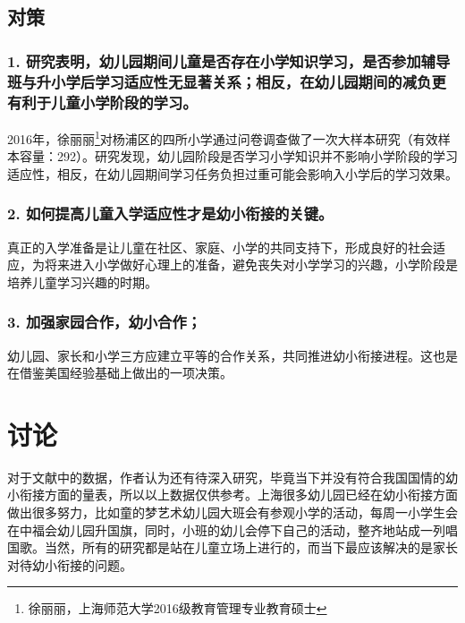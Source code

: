 \documentclass[a4paper,oneside]{article}
\begin{document}
    \subsection{对策}
        \subsubsection*{1. 研究表明，幼儿园期间儿童是否存在小学知识学习，是否参加辅导班与升小学后学习适应性无显著关系；相反，在幼儿园期间的减负更有利于儿童小学阶段的学习。}
            2016年，徐丽丽\footnote{徐丽丽，上海师范大学2016级教育管理专业教育硕士}对杨浦区的四所小学通过问卷调查做了一次大样本研究（有效样本容量：292）。研究发现，幼儿园阶段是否学习小学知识并不影响小学阶段的学习适应性，相反，在幼儿园期间学习任务负担过重可能会影响入小学后的学习效果。
        \subsubsection*{2. 如何提高儿童入学适应性才是幼小衔接的关键。}
            真正的入学准备是让儿童在社区、家庭、小学的共同支持下，形成良好的社会适应，为将来进入小学做好心理上的准备，避免丧失对小学学习的兴趣，小学阶段是培养儿童学习兴趣的时期。
        \subsubsection*{3. 加强家园合作，幼小合作；}
            幼儿园、家长和小学三方应建立平等的合作关系，共同推进幼小衔接进程。这也是在借鉴美国经验基础上做出的一项决策。
\section{讨论}
    对于文献中的数据，作者认为还有待深入研究，毕竟当下并没有符合我国国情的幼小衔接方面的量表，所以以上数据仅供参考。上海很多幼儿园已经在幼小衔接方面做出很多努力，比如童的梦艺术幼儿园大班会有参观小学的活动，每周一小学生会在中福会幼儿园升国旗，同时，小班的幼儿会停下自己的活动，整齐地站成一列唱国歌。当然，所有的研究都是站在儿童立场上进行的，而当下最应该解决的是家长对待幼小衔接的问题。
\end{document}
